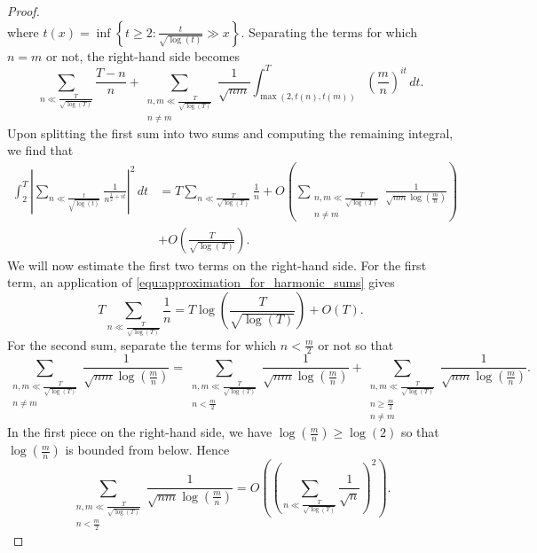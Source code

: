 \begin{proof}
\[      \]
      where \(t(x) = \inf\left\{t \ge 2:\frac{t}{\sqrt{\log(t)}} \gg x\right\}\). Separating the terms for which \(n = m\) or not, the right-hand side becomes
      \[
        \sum_{n \ll \frac{T}{\sqrt{\log(T)}}}\frac{T-n}{n}+ \sum_{\substack{n,m \ll \frac{T}{\sqrt{\log(T)}} \\ n \neq m}}\frac{1}{\sqrt{nm}}\int_{\max(2,t(n),t(m))}^{T}\left(\frac{m}{n}\right)^{it}\,dt.
      \]
      Upon splitting the first sum into two sums and computing the remaining integral, we find that
      \begin{equation}\label{equ:second_moment_zeta_asymptotic_equivalence_4}
        \begin{aligned}
          \int_{2}^{T}\left|\sum_{n \ll \frac{t}{\sqrt{\log(t)}}}\frac{1}{n^{\frac{1}{2}+it}}\right|^{2}\,dt &= T\sum_{n \ll \frac{T}{\sqrt{\log(T)}}}\frac{1}{n}+O\left(\sum_{\substack{n,m \ll \frac{T}{\sqrt{\log(T)}} \\ n \neq m}}\frac{1}{\sqrt{nm}\log\left(\frac{m}{n}\right)}\right) \\
          &+ O\left(\frac{T}{\sqrt{\log(T)}}\right).
        \end{aligned}
      \end{equation}
      We will now estimate the first two terms on the right-hand side. For the first term, an application of \cref{equ:approximation_for_harmonic_sums} gives
      \begin{equation}\label{equ:second_moment_zeta_asymptotic_equivalence_5}
        T\sum_{n \ll \frac{T}{\sqrt{\log(T)}}}\frac{1}{n} = T\log\left(\frac{T}{\sqrt{\log(T)}}\right)+O(T).
      \end{equation}
      For the second sum, separate the terms for which \(n < \frac{m}{2}\) or not so that
      \[
        \sum_{\substack{n,m \ll \frac{T}{\sqrt{\log(T)}} \\ n \neq m}}\frac{1}{\sqrt{nm}\log\left(\frac{m}{n}\right)} = \sum_{\substack{n,m \ll \frac{T}{\sqrt{\log(T)}} \\ n < \frac{m}{2}}}\frac{1}{\sqrt{nm}\log\left(\frac{m}{n}\right)}+\sum_{\substack{n,m \ll \frac{T}{\sqrt{\log(T)}} \\ n \ge \frac{m}{2} \\ n \neq m}}\frac{1}{\sqrt{nm}\log\left(\frac{m}{n}\right)}.
      \]
      In the first piece on the right-hand side, we have \(\log\left(\frac{m}{n}\right) \ge \log\left(2\right)\) so that \(\log\left(\frac{m}{n}\right)\) is bounded from below. Hence
      \[
        \sum_{\substack{n,m \ll \frac{T}{\sqrt{\log(T)}} \\ n < \frac{m}{2}}}\frac{1}{\sqrt{nm}\log\left(\frac{m}{n}\right)} = O\left(\left(\sum_{n \ll \frac{T}{\sqrt{\log(T)}}}\frac{1}{\sqrt{n}}\right)^{2}\right).
\]
\end{proof}
